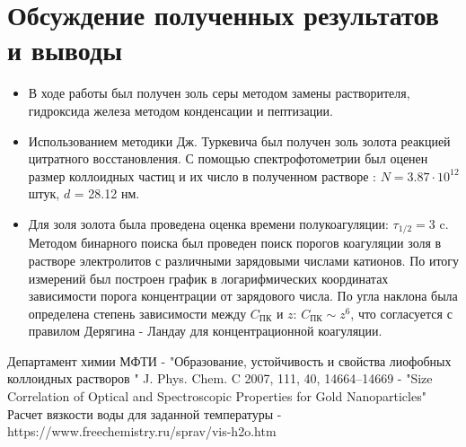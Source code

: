 \documentclass[a4paper,12pt]{article}
\begin{document}
\section{Обсуждение полученных результатов и выводы}
\begin{itemize}
    \item В ходе работы был получен золь серы методом замены растворителя, гидроксида железа методом конденсации и пептизации. 
    \item Использованием методики Дж. Туркевича был получен золь золота реакцией цитратного восстановления. С помощью спектрофотометрии был оценен размер коллоидных частиц и их число в полученном растворе : $N = 3.87 \cdot 10^{12}$ штук, $d$ = 28.12 нм. 
    \item Для золя золота была проведена оценка времени полукоагуляции: $\tau_{1/2} = 3$ c. Методом бинарного поиска был проведен поиск порогов коагуляции золя в растворе электролитов с различными зарядовыми числами катионов. По итогу измерений был построен график в логарифмических координатах зависимости порога концентрации от зарядового числа. По угла наклона была определена степень зависимости между $C_{\text{ПК}}$ и $z$: $C_{\text{ПК}} \sim z^{6}$, что согласуется с правилом Дерягина - Ландау для концентрационной коагуляции.
    
\end{itemize}

\newpage

\begin{thebibliography}{}
      Департамент химии МФТИ -  "Образование, устойчивость и свойства лиофобных коллоидных растворов "
      J. Phys. Chem. C 2007, 111, 40, 14664–14669 - "Size Correlation of Optical and Spectroscopic Properties for Gold Nanoparticles"
     Расчет вязкости воды 
 для заданной температуры - https://www.freechemistry.ru/sprav/vis-h2o.htm
\end{thebibliography}
\end{document}
